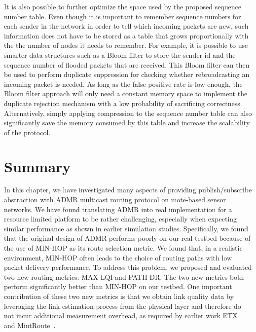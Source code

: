 It is also possible to further optimize the space used by the proposed
sequence number table. Even though it is important to remember sequence
numbers for each sender in the network in order to tell which incoming packets
are new, such information does not have to be stored as a table that grows
proportionally with the the number of nodes it needs to remember. For example,
it is possible to use smarter data structures such as a Bloom filter to store
the sender id and the sequence number of flooded packets that are received.
This Bloom filter can then be used to perform duplicate suppression for
checking whether rebroadcasting an incoming packet is needed. As long as the
false positive rate is low enough, the Bloom filter approach will only need a
constant memory space to implement the duplicate rejection mechanism with a
low probability of sacrificing correctness. Alternatively, simply applying
compression to the sequence number table can also significantly save the
memory consumed by this table and increase the scalability of the protocol.


\section{Summary}
\label{sec-tinyadmr-future}
\label{sec-tinyadmr-futurework}
\label{sec-tinyadmr-conclusions}
\label{sec-tinyadmr-conclusion}

In this chapter, we have investigated many aspects of providing
publish/subscribe abstraction with ADMR multicast routing protocol on
mote-based sensor networks. We have found translating ADMR into real
implementation for a
resource limited platform to be rather challenging, especially when
expecting similar performance as shown in earlier simulation studies. Specifically, we 
found that the original design of ADMR performs poorly on our real testbed
because of the use of MIN-HOP as its route selection metric. We found that, in a realistic
environment, MIN-HOP often leads to the choice of routing paths with low
packet delivery performance. To address this problem, we proposed and
evaluated two new routing metrics: MAX-LQI and PATH-DR. The two new metrics
both perform significantly better than MIN-HOP on our testbed. One important
contribution of these two new metrics is that we obtain
link quality data by leveraging the link estimation process from the
physical layer and therefore do not incur additional measurement overhead, as
required by earlier work ETX~\cite{etx} and MintRoute~\cite{awoo-multihop}.

